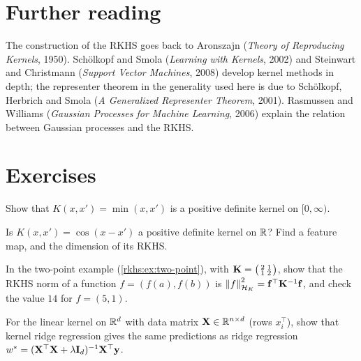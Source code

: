 \begin{notechapter}
\section*{Further reading}
The construction of the RKHS goes back to Aronszajn (\emph{Theory of Reproducing Kernels}, 1950). Schölkopf and Smola (\emph{Learning with Kernels}, 2002) and Steinwart and Christmann (\emph{Support Vector Machines}, 2008) develop kernel methods in depth; the representer theorem in the generality used here is due to Schölkopf, Herbrich and Smola (\emph{A Generalized Representer Theorem}, 2001). Rasmussen and Williams (\emph{Gaussian Processes for Machine Learning}, 2006) explain the relation between Gaussian processes and the RKHS.

\section*{Exercises}

\begin{exercise}\label{rkhs:exr:1}
Show that $K(x,x') = \min(x,x')$ is a positive definite kernel on $[0,\infty)$.
\end{exercise}

\begin{exercise}\label{rkhs:exr:2}
Is $K(x,x') = \cos(x - x')$ a positive definite kernel on $\mathbb{R}$? Find a feature map, and the dimension of its RKHS.
\end{exercise}

\begin{exercise}\label{rkhs:exr:3}
In the two-point example (\cref{rkhs:ex:two-point}), with $\mathbf{K} = \bigl(\begin{smallmatrix}2&1\\1&2\end{smallmatrix}\bigr)$, show that the RKHS norm of a function $f = (f(a), f(b))$ is $\left\|f\right\|_{\mathcal{H}_K}^2 = \mathbf{f}^\top\mathbf{K}^{-1}\mathbf{f}$, and check the value $14$ for $f = (5, 1)$.
\end{exercise}

\begin{exercise}\label{rkhs:exr:4}
For the linear kernel on $\mathbb{R}^d$ with data matrix $\mathbf{X} \in \mathbb{R}^{n\times d}$ (rows $x_i^\top$), show that kernel ridge regression gives the same predictions as ridge regression $w^* = (\mathbf{X}^\top\mathbf{X} + \lambda\mathbf{I}_d)^{-1}\mathbf{X}^\top\mathbf{y}$.
\end{exercise}
\end{notechapter}

